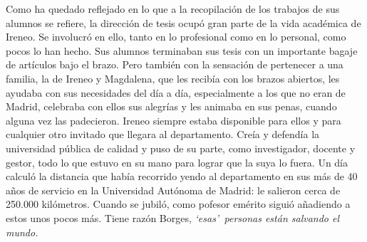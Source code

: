  Como ha quedado reflejado en lo que a la recopilaci\'on  de los trabajos de sus alumnos se refiere, la direcci\'on de tesis ocup\'o gran parte de la vida acad\'emica de Ireneo. Se involucr\'o en ello, tanto en lo profesional como en lo personal, como pocos lo han hecho. Sus alumnos terminaban sus tesis con un importante bagaje de art\'iculos bajo el brazo. Pero tambi\'en con la sensaci\'on de pertenecer a una familia, la de Ireneo y Magdalena, que les recib\'ia con los brazos abiertos, les ayudaba con sus necesidades del d\'ia a d\'ia, especialmente a los que no eran de Madrid,  celebraba con ellos sus alegr\'ias y les animaba en sus penas, cuando alguna vez las padecieron. Ireneo siempre estaba disponible para ellos y para cualquier otro invitado que llegara al departamento. Cre\'ia y defend\'ia la universidad p\'ublica de calidad y puso de su parte, {como investigador, docente y gestor},  todo lo que estuvo en su mano para lograr que la suya lo fuera. Un d\'ia calcul\'o la distancia que hab\'ia recorrido yendo al departamento en sus m\'as de 40 a\~nos de servicio en la Universidad Aut\'onoma de Madrid: le salieron cerca de 250.000 kil\'ometros. Cuando se jubil\'o, como pofesor em\'erito sigui\'o a\~nadiendo a estos unos pocos m\'as. Tiene raz\'on Borges, \textit{\lq esas\rq\, personas est\'an salvando el mundo.}
 
